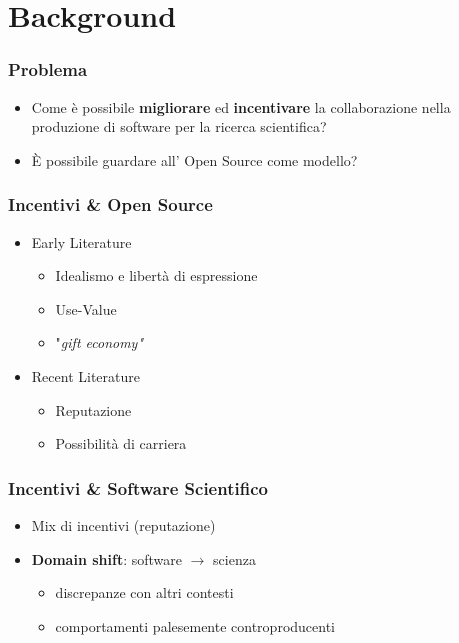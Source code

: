 \section{Background}

\begin{frame}\frametitle{Problema}

\begin{itemize}[<+->]
\item
  Come è possibile \textbf{migliorare} ed \textbf{incentivare} la
  collaborazione nella produzione di software per la ricerca
  scientifica?
\item
  È possibile guardare all' Open Source come modello?
\end{itemize}

\end{frame}

\begin{frame}\frametitle{Incentivi \& Open Source}

\begin{itemize}[<+->]
\itemsep1pt\parskip0pt
\item
  Early Literature

  \begin{itemize}[<+->]
  \itemsep1pt\parskip0pt
  \item
    Idealismo e libertà di espressione
  \item
    Use-Value
  \item
    "\em{gift economy}"
  \end{itemize}
\item
  Recent Literature

  \begin{itemize}[<+->]
  \itemsep1pt\parskip0pt
  \item
    Reputazione
  \item
    Possibilità di carriera
  \end{itemize}
\end{itemize}

\end{frame}

\begin{frame}\frametitle{Incentivi \& Software Scientifico}

\begin{itemize}[<+->]
\itemsep1pt\parskip0pt
\item
  Mix di incentivi (reputazione)
\item
  \textbf{Domain shift}: software $\rightarrow$ scienza

  \begin{itemize}[<+->]
  \itemsep1pt\parskip0pt
  \item
    discrepanze con altri contesti
  \item
    comportamenti palesemente controproducenti
  \end{itemize}
\end{itemize}

\end{frame}

